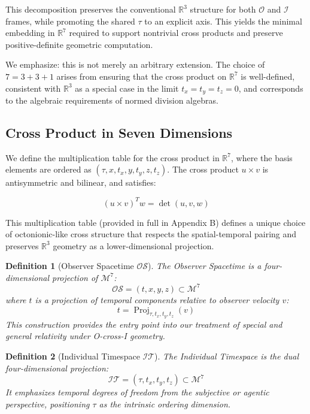 \documentclass{article}
\newtheorem{definition}{Definition}
\DeclareMathOperator{\Proj}{Proj}
\begin{document}
This decomposition preserves the conventional \(\mathbb{R}^3\) structure for both \(\mathcal{O}\) and \(\mathcal{I}\) frames, while promoting the shared \(\tau\) to an explicit axis. This yields the minimal embedding in \(\mathbb{R}^7\) required to support nontrivial cross products and preserve positive-definite geometric computation.

We emphasize: this is not merely an arbitrary extension. The choice of \(7 = 3 + 3 + 1\) arises from ensuring that the cross product on \(\mathbb{R}^7\) is well-defined, consistent with \(\mathbb{R}^3\) as a special case in the limit \(t_x = t_y = t_z = 0\), and corresponds to the algebraic requirements of normed division algebras.

\subsection*{Cross Product in Seven Dimensions}

We define the multiplication table for the cross product in \(\mathbb{R}^7\), where the basis elements are ordered as \( (\tau, x, t_x, y, t_y, z, t_z) \). The cross product \( u \times v \) is antisymmetric and bilinear, and satisfies:

\begin{equation}
(u \times v)^T w = \det(u, v, w)
\end{equation}

This multiplication table (provided in full in Appendix B) defines a unique choice of octonionic-like cross structure that respects the spatial-temporal pairing and preserves \(\mathbb{R}^3\) geometry as a lower-dimensional projection.

\begin{definition}[Observer Spacetime \(\mathcal{OS}\)]
The Observer Spacetime is a four-dimensional projection of \(\mathcal{M}^7\):
\begin{equation}
\mathcal{OS} = (t, x, y, z) \subset \mathcal{M}^7
\end{equation}
where \( t \) is a projection of temporal components relative to observer velocity \( v \):
\begin{equation}
\label{eq:observer_time_projection}
t = \Proj_{\tau, t_x, t_y, t_z}(v)
\end{equation}
This construction provides the entry point into our treatment of special and general relativity under O-cross-I geometry.
\end{definition}

\begin{definition}[Individual Timespace \(\mathcal{IT}\)]
The Individual Timespace is the dual four-dimensional projection:
\begin{equation}
\mathcal{IT} = (\tau, t_x, t_y, t_z) \subset \mathcal{M}^7
\end{equation}
It emphasizes temporal degrees of freedom from the subjective or agentic perspective, positioning \(\tau\) as the intrinsic ordering dimension.
\end{definition}
\end{document}
